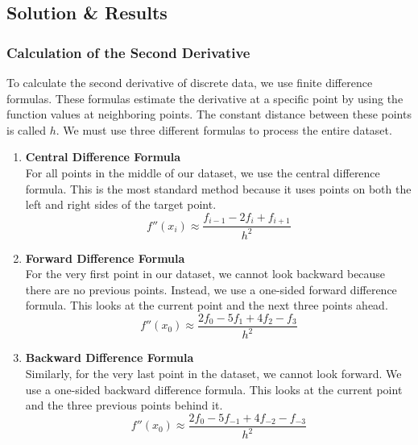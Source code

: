 \documentclass{article}
\begin{document}
\vspace{10pt}
\subsection{Solution \& Results}

\subsubsection{Calculation of the Second Derivative}

To calculate the second derivative of discrete data, we use finite difference formulas. These formulas estimate the derivative at a specific point by using the function values at neighboring points. The constant distance between these points is called $h$. We must use three different formulas to process the entire dataset.

\begin{enumerate}
    \item \textbf{Central Difference Formula} \cite[page 329]{MathewsFink2003} \\
    For all points in the middle of our dataset, we use the central difference formula. This is the most standard method because it uses points on both the left and right sides of the target point.
    \begin{equation*}
        f''(x_i) \approx \frac{f_{i-1} - 2f_{i} + f_{i+1}}{h^2}
    \end{equation*}

    \item \textbf{Forward Difference Formula} \cite[page 333]{MathewsFink2003} \\
    For the very first point in our dataset, we cannot look backward because there are no previous points. Instead, we use a one-sided forward difference formula. This looks at the current point and the next three points ahead.
    \begin{equation*}
        f''(x_0) \approx \frac{2f_0 - 5f_1 + 4f_2 - f_3}{h^2}
    \end{equation*}

    \item \textbf{Backward Difference Formula} \cite[page 333]{MathewsFink2003} \\
    Similarly, for the very last point in the dataset, we cannot look forward. We use a one-sided backward difference formula. This looks at the current point and the three previous points behind it.
    \begin{equation*}
        f''(x_0) \approx \frac{2f_0 - 5f_{-1} + 4f_{-2} - f_{-3}}{h^2}
    \end{equation*}
\end{enumerate}
\end{document}
